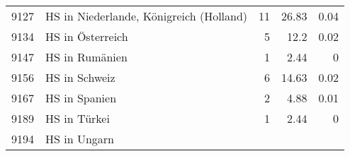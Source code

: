 \begin{longtable}{lXrrr}
     9127 &
     \multicolumn{1}{X}{ HS in Niederlande, Königreich (Holland)   } &


       \num{11} &
       \num[round-mode=places,round-precision=2]{26,83} &
         \num[round-mode=places,round-precision=2]{0,04} \\

     9134 &
     \multicolumn{1}{X}{ HS in Österreich   } &


       \num{5} &
       \num[round-mode=places,round-precision=2]{12,2} &
         \num[round-mode=places,round-precision=2]{0,02} \\

     9147 &
     \multicolumn{1}{X}{ HS in Rumänien   } &


       \num{1} &
       \num[round-mode=places,round-precision=2]{2,44} &
         \num[round-mode=places,round-precision=2]{0} \\

     9156 &
     \multicolumn{1}{X}{ HS in Schweiz   } &


       \num{6} &
       \num[round-mode=places,round-precision=2]{14,63} &
         \num[round-mode=places,round-precision=2]{0,02} \\

     9167 &
     \multicolumn{1}{X}{ HS in Spanien   } &


       \num{2} &
       \num[round-mode=places,round-precision=2]{4,88} &
         \num[round-mode=places,round-precision=2]{0,01} \\

     9189 &
     \multicolumn{1}{X}{ HS in Türkei   } &


       \num{1} &
       \num[round-mode=places,round-precision=2]{2,44} &
         \num[round-mode=places,round-precision=2]{0} \\

     9194 &
     \multicolumn{1}{X}{ HS in Ungarn   } &



\end{longtable}
